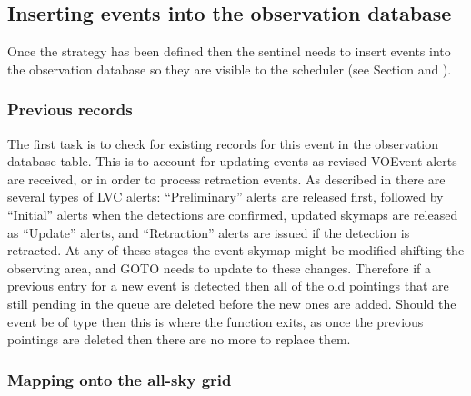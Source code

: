 \begin{colsection}
\begin{colsection}
\end{colsection}


\newpage
\subsection{Inserting events into the observation database}
\label{sec:event_insert}
\begin{colsection}

Once the strategy has been defined then the sentinel needs to insert events into the observation database so they are visible to the scheduler (see Section  and ).

\subsubsection{Previous records}

The first task is to check for existing records for this event in the observation database  table. This is to account for updating events as revised VOEvent alerts are received, or in order to process retraction events. As described in  there are several types of LVC alerts: ``Preliminary'' alerts are released first, followed by ``Initial'' alerts when the detections are confirmed, updated skymaps are released as ``Update'' alerts, and ``Retraction'' alerts are issued if the detection is retracted. At any of these stages the event skymap might be modified shifting the observing area, and GOTO needs to update to these changes. Therefore if a previous entry for a new event is detected then all of the old pointings that are still pending in the queue are deleted before the new ones are added. Should the event be of type  then this is where the function exits, as once the previous pointings are deleted then there are no more to replace them.

\subsubsection{Mapping onto the all-sky grid}


\end{colsection}
\end{colsection}
